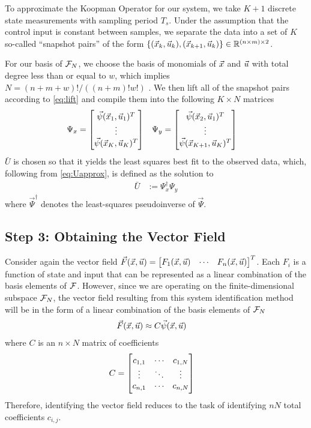 To approximate the Koopman Operator for our system, we take $K+1$ discrete state measurements with sampling period $T_s$. Under the assumption that the control input is constant between samples, we separate the data into a set of $K$ so-called ``snapshot pairs'' of the form ${ \{(\vec{x}_k,\vec{u}_k),(\vec{x}_{k+1},\vec{u}_k)\} \in \mathbb{R}^{(n \times m) \times 2} }$. 

For our basis of $\mathcal{F}_N$, we choose the basis of monomials of $\vec{x}$ and $\vec{u}$ with total degree less than or equal to $w$, which implies $N=(n+m+w)!/\left((n+m)!w!\right)$ . 
We then lift all of the snapshot pairs according to \eqref{eq:lift} and compile them into the following $K \times N$ matrices
\begin{align}
    &\Psi_x = \begin{bmatrix}  \vec{\psi}(\vec{x}_1, \vec{u}_1)^T \\ \vdots \\  \vec{\psi}(\vec{x}_K, \vec{u}_K)^T \end{bmatrix}
    &&\Psi_y = \begin{bmatrix}  \vec{\psi}(\vec{x}_2, \vec{u}_1)^T \\ \vdots \\  \vec{\psi}(\vec{x}_{K+1}, \vec{u}_{K})^T \end{bmatrix}
\end{align}
$\bar{U}$ is chosen so that it yields the least squares best fit to the observed data, which, following from \eqref{eq:Uapprox}, is defined as the solution to 
\begin{align}
    \bar{U} &:= \Psi_x^\dagger \Psi_y
\end{align}
where $\vec{\Psi}^\dagger$ denotes the least-squares pseudoinverse of $\vec{\Psi}$.


\subsection{Step 3: Obtaining the Vector Field}

Consider again the vector field ${ \vec{F}(\vec{x},\vec{u})=\begin{bmatrix} F_1(\vec{x},\vec{u}) & \cdots & F_n(\vec{x},\vec{u}) \end{bmatrix}^T }$.
Each $F_i$ is a function of state and input that can be represented as a linear combination of the basis elements of $\mathcal{F}$.
However, since we are operating on the finite-dimensional subspace $\mathcal{F}_N$, the vector field resulting from this system identification method will be in the form of a linear combination of the basis elements of $\mathcal{F}_N$
\begin{align}
    \vec{F}(\vec{x}, \vec{u}) &\approx C \vec{\psi}(\vec{x}, \vec{u})
\end{align}
where $C$ is an $n \times N$ matrix of coefficients
\begin{align}
    C &= \begin{bmatrix}  c_{1,1} & \cdots & c_{1,N} \\ \vdots & \ddots & \vdots \\ c_{n,1} & \cdots & c_{n,N}  \end{bmatrix}
    \label{eq:C}
\end{align}
Therefore, identifying the vector field reduces to the task of identifying $nN$ total coefficients $c_{i,j}$.

